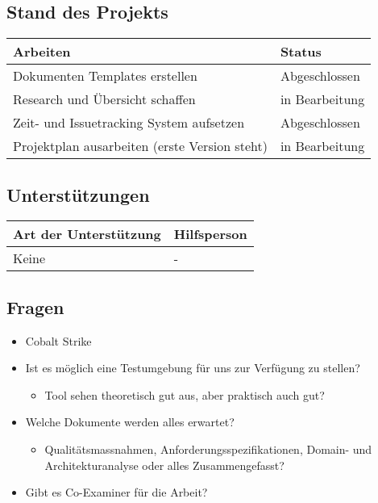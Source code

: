 \clearpage


\subsection*{Stand des Projekts}
\begin{table}[H]
    \centering
    \begin{tabular}{p{12cm} p{4cm}}
        \textbf{Arbeiten} & \textbf{Status} \\ \hline
        Dokumenten Templates erstellen & Abgeschlossen \\ \hline
        Research und Übersicht schaffen & in Bearbeitung \\ \hline
        Zeit- und Issuetracking System aufsetzen & Abgeschlossen \\ \hline
        Projektplan ausarbeiten (erste Version steht) & in Bearbeitung \\ \hline
    \end{tabular}
\end{table}

\vspace{1cm}

\subsection*{Unterstützungen}
\begin{table}[H]
    \centering
    \begin{tabular}{p{12cm} p{4cm}}
        \textbf{Art der Unterstützung} & \textbf{Hilfsperson} \\ \hline
        Keine & - \\ \hline
    \end{tabular}
\end{table}

\vspace{1cm}

\subsection*{Fragen}
\begin{itemize}
    \item Cobalt Strike
    \item Ist es möglich eine Testumgebung für uns zur Verfügung zu stellen? 
    \begin{itemize}
        \item Tool sehen theoretisch gut aus, aber praktisch auch gut?
    \end{itemize}
    \item Welche Dokumente werden alles erwartet? 
    \begin{itemize}
        \item Qualitätsmassnahmen, Anforderungsspezifikationen, Domain- und Architekturanalyse oder alles Zusammengefasst? 
    \end{itemize}
    \item Gibt es Co-Examiner für die Arbeit?
\end{itemize}

